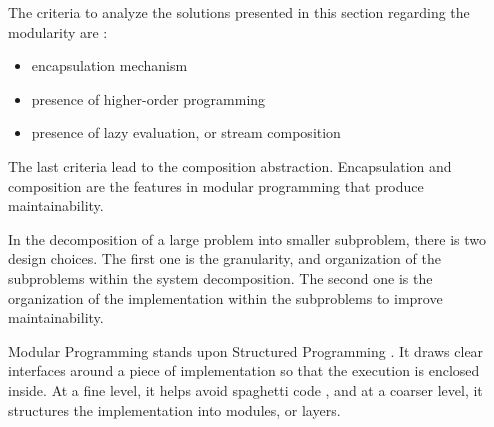 The criteria to analyze the solutions presented in this section regarding the modularity are :
\begin{itemize}
\item encapsulation mechanism
\item presence of higher-order programming
\item presence of lazy evaluation, or stream composition
\end{itemize}
The last criteria lead to the composition abstraction.
Encapsulation and composition are the features in modular programming that produce maintainability.



In the decomposition of a large problem into smaller subproblem, there is two design choices.
The first one is the granularity, and organization of the subproblems within the system decomposition.
The second one is the organization of the implementation within the subproblems to improve maintainability.




Modular Programming stands upon Structured Programming \cite{Dijkstra1970}.
It draws clear interfaces around a piece of implementation so that the execution is enclosed inside.
At a fine level, it helps avoid spaghetti code \cite{Dijkstra1968a}, and at a coarser level, it structures the implementation \cite{Dijkstra1968} into modules, or layers.


